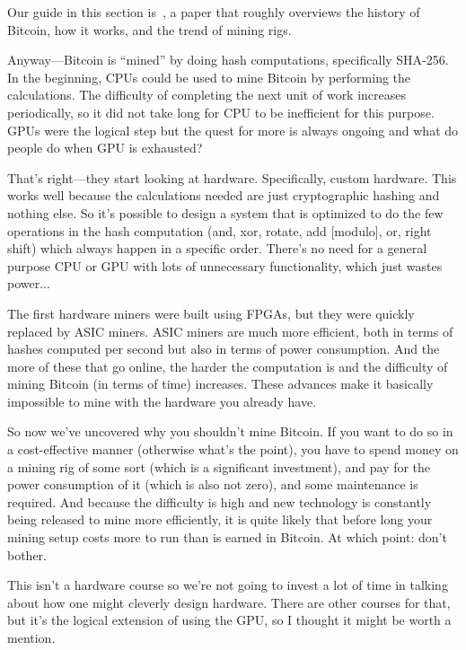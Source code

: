 \documentclass[a4paper]{report}
\begin{document}
Our guide in this section is~\cite{bitcoin}, a paper that roughly overviews the history of Bitcoin, how it works, and the trend of mining rigs. 

Anyway---Bitcoin is ``mined'' by doing hash computations, specifically SHA-256. In the beginning, CPUs could be used to mine Bitcoin by performing the calculations. The difficulty of completing the next unit of work increases periodically, so it did not take long for CPU to be inefficient for this purpose. GPUs were the logical step but the quest for more is always ongoing and what do people do when GPU is exhausted?

That's right---they start looking at hardware. Specifically, custom hardware. This works well because the calculations needed are just cryptographic hashing and nothing else. So it's possible to design a system that is optimized to do the few operations in the hash computation (and, xor, rotate, add [modulo], or, right shift) which always happen in a specific order. There's no need for a general purpose CPU or GPU with lots of unnecessary functionality, which just wastes power...

 The first hardware miners were built using FPGAs, but they were quickly replaced by ASIC miners. ASIC miners are much more efficient, both in terms of hashes computed per second but also in terms of power consumption. And the more of these that go online, the harder the computation is and the difficulty of mining Bitcoin (in terms of time) increases. These advances make it basically impossible to mine with the hardware you already have.

So now we've uncovered why you shouldn't mine Bitcoin. If you want to do so in a cost-effective manner (otherwise what's the point), you have to spend money on a mining rig of some sort (which is a significant investment), and pay for the power consumption of it (which is also not zero), and some maintenance is required. And because the difficulty is high and new technology is constantly being released to mine more efficiently, it is quite likely that before long your mining setup costs more to run than is earned in Bitcoin. At which point: don't bother.

This isn't a hardware course so we're not going to invest a lot of time in talking about how one might cleverly design hardware. There are other courses for that, but it's the logical extension of using the GPU, so I thought it might be worth a mention.
\end{document}
